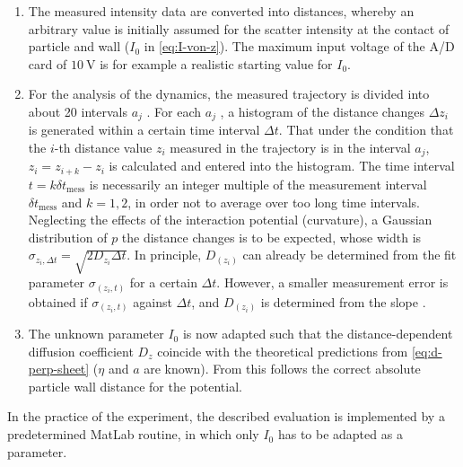 \documentclass[.../bericht]{subfilies}
\begin{document}
        \begin{enumerate}
          \item The measured intensity data are converted into distances, whereby an arbitrary value is initially assumed for the scatter intensity at the contact of particle and wall ($I_0$ in \cref{eq:I-von-z}). The maximum input voltage of the A/D card of $\SI{10}{\volt}$ is for example a realistic starting value for $I_0$.
          \item For the analysis of the dynamics, the measured trajectory is divided into about 20 intervals $a_j$ . For each $a_j$ , a histogram of the distance changes $\Delta z_i$ is generated within a certain time interval $\Delta t$. That under the condition that the $i$-th distance value $z_i$ measured in the trajectory is in the interval $a_j$, $z_i = z_{i+k} - z_i$ is calculated and entered into the histogram. The time interval $t = k \delta t_\mathrm{mess}$ is necessarily an integer multiple of the measurement interval $\delta t_\mathrm{mess}$ and $k = 1,2$, in order not to average over too long time intervals. Neglecting the effects of the interaction potential (curvature), a Gaussian distribution of $p$ the distance changes is to be expected, whose width is $\sigma_{z_i ,\Delta t} = \sqrt{2D_{z_i} \Delta t}$. In principle, $D_{(z_i)}$ can already be determined from the fit parameter $\sigma_{(z_i,t)}$ for a certain $\Delta t$. However, a smaller measurement error is obtained if $\sigma_{(z_i ,t)}$ against $\Delta t$, and  $D_{(z_i)}$ is determined from the slope \cite{4}.
          \item The unknown parameter $I_0$ is now adapted such that the distance-dependent diffusion coefficient $D_z$ coincide with the theoretical predictions from \cref{eq:d-perp-sheet} ($\eta$ and $a$ are known). From this follows the correct absolute particle wall distance for the potential.
        \end{enumerate}
        In the practice of the experiment, the described evaluation is implemented by a predetermined MatLab routine, in which only $I_0$ has to be adapted as a parameter.
\end{document}
